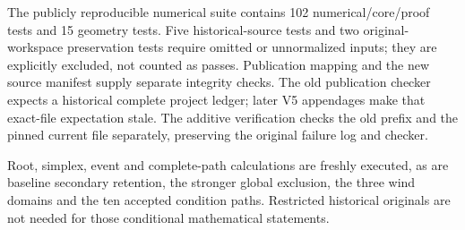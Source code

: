 The publicly reproducible numerical suite contains 102 numerical/core/proof tests and 15 geometry tests. Five historical-source tests and two original-workspace preservation tests require omitted or unnormalized inputs; they are explicitly excluded, not counted as passes. Publication mapping and the new source manifest supply separate integrity checks. The old publication checker expects a historical complete project ledger; later V5 appendages make that exact-file expectation stale. The additive verification checks the old prefix and the pinned current file separately, preserving the original failure log and checker.

Root, simplex, event and complete-path calculations are freshly executed, as are baseline secondary retention, the stronger global exclusion, the three wind domains and the ten accepted condition paths. Restricted historical originals are not needed for those conditional mathematical statements. 
